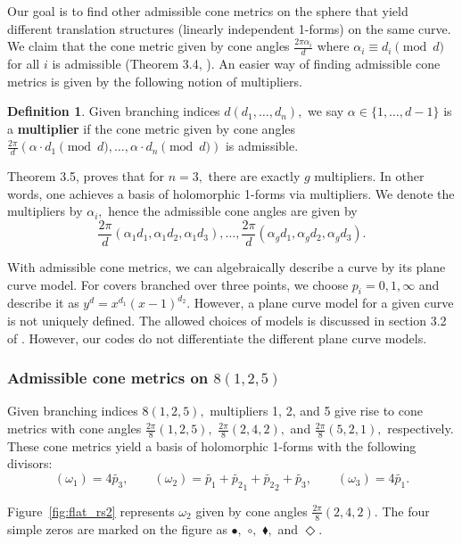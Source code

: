 \documentclass[12pt,reqno]{amsart}
\theoremstyle{definition}
\newtheorem{defn}{Definition}
\theoremstyle{remark}
\begin{document}
Our goal is to find other admissible cone metrics on the sphere that yield different translation structures (linearly independent 1-forms) on the same curve. We claim that the cone metric given by cone angles $\frac{2 \pi \alpha_i}{d}$ where $\alpha_i \equiv d_i \pmod d$ for all $i$ is admissible (Theorem 3.4, \cite{dthesis}). An easier way of finding admissible cone metrics is given by the following notion of multipliers.

\begin{defn} Given branching indices $d (d_1, \ldots , d_n),$ we say $\alpha \in \{1, \ldots, d - 1\}$ is a \textbf{multiplier} if the cone metric given by cone angles $\frac{2 \pi}{d} (\alpha \cdot d_1 \pmod d, \ldots , \alpha \cdot d_n \pmod d)$ is admissible. 
\end{defn}

Theorem 3.5, \cite{dthesis} proves that for $n = 3,$ there are exactly $g$ multipliers. In other words, one achieves a basis of holomorphic 1-forms via multipliers. We denote the multipliers by $\alpha_i,$ hence the admissible cone angles are given by $$\frac{2\pi}{d}(\alpha_1 d_1, \alpha_1 d_2, \alpha_1 d_3), \ldots , \frac{2\pi}{d}(\alpha_g d_1, \alpha_g d_2, \alpha_g d_3).$$ 

With admissible cone metrics, we can algebraically describe a curve by its plane curve model. For covers branched over three points, we choose $p_i = 0, 1, \infty$ and describe it as $y^d = x^{d_1} (x-1)^{d_2}.$ However, a plane curve model for a given curve is not uniquely defined. The allowed choices of models is discussed in section 3.2 of \cite{dthesis}. However, our codes do not differentiate the different plane curve models.

\subsubsection*{Admissible cone metrics on $8 (1, 2, 5)$} Given branching indices $8 (1, 2, 5),$ multipliers 1, 2, and 5 give rise to cone metrics with cone angles $\frac{2 \pi}{8}(1, 2, 5),$ $\frac{2 \pi}{8}(2, 4, 2),$ and $\frac{2 \pi}{8}(5, 2, 1),$ respectively. These cone metrics yield a basis of holomorphic 1-forms with the following divisors: $$(\omega_1) = 4 \widetilde{p_3}, \qquad (\omega_2) = \widetilde{p_1} + \widetilde{p_2}_1 + \widetilde{p_2}_2 + \widetilde{p_3}, \qquad (\omega_3) = 4 \widetilde{p_1}.$$

Figure~\ref{fig:flat_rs2} represents $\omega_2$ given by cone angles $\frac{2 \pi}{8}(2, 4, 2).$ The four simple zeros are marked on the figure as $\bullet,$ $\circ,$ $\blacklozenge,$ and $\Diamond.$
\end{document}
